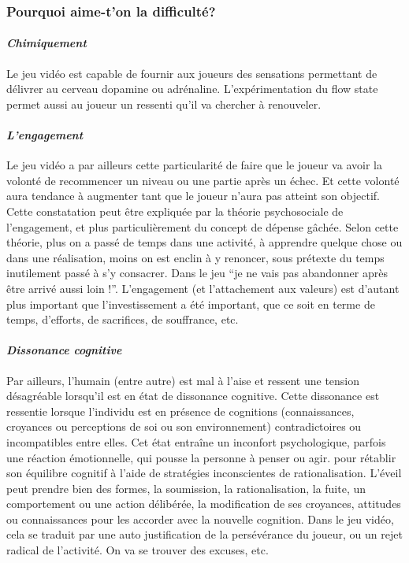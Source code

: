 		\subsubsection{Pourquoi aime-t'on la difficulté?}
			\paragraph{\emph{Chimiquement} \\ \quad}
Le jeu vidéo est capable de fournir aux joueurs des sensations permettant de délivrer au cerveau dopamine ou adrénaline. L’expérimentation du flow state permet aussi au joueur un ressenti qu’il va chercher à renouveler.

			\paragraph{\emph{L’engagement} \\ \quad}
Le jeu vidéo a par ailleurs cette particularité de faire que le joueur va avoir la volonté de recommencer un niveau ou une partie après un échec. Et cette volonté aura tendance à augmenter tant que le joueur n’aura pas atteint son objectif. Cette constatation peut être expliquée par la théorie psychosociale de l’engagement, et plus particulièrement du concept de dépense gâchée. Selon cette théorie, plus on a passé de temps dans une activité, à apprendre quelque chose ou dans une réalisation, moins on est enclin à y renoncer, sous prétexte du temps inutilement passé à s’y consacrer. Dans le jeu “je ne vais pas abandonner après être arrivé aussi loin !”. L’engagement (et l’attachement aux valeurs) est d’autant plus important que l’investissement a été important, que ce soit en terme de temps, d’efforts, de sacrifices, de souffrance, etc.

			\paragraph{\emph{Dissonance cognitive} \\ \quad}
Par ailleurs, l’humain (entre autre) est mal à l’aise et ressent une tension désagréable lorsqu’il est en état de dissonance cognitive. Cette dissonance est ressentie lorsque l’individu est en présence de cognitions (connaissances, croyances ou perceptions de soi ou son environnement) contradictoires ou incompatibles entre elles.
Cet état entraîne un inconfort psychologique, parfois une réaction émotionnelle, qui pousse la personne à penser ou agir. pour rétablir son équilibre cognitif à l’aide de stratégies inconscientes de rationalisation. L’éveil peut prendre bien des formes, la soumission, la rationalisation, la fuite, un comportement ou une action délibérée, la modification de ses croyances, attitudes ou connaissances pour les accorder avec la nouvelle cognition. Dans le jeu vidéo, cela se traduit par une auto justification de la persévérance du joueur, ou un rejet radical de l’activité. On va se trouver des excuses, etc.

